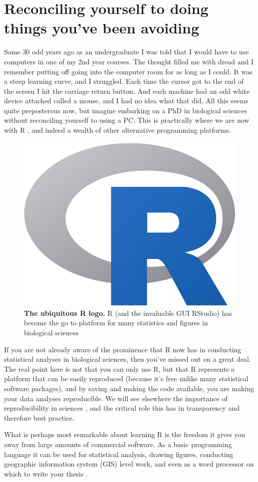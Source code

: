 \documentclass[
]{krantz}
\begin{document}
\hypertarget{useR}{%
\section{Reconciling yourself to doing things you've been avoiding}\label{useR}}

Some 30 odd years ago as an undergraduate I was told that I would have to use computers in one of my 2nd year courses. The thought filled me with dread and I remember putting off going into the computer room for as long as I could. It was a steep learning curve, and I struggled. Each time the cursor got to the end of the screen I hit the carriage return button. And each machine had an odd white device attached called a mouse, and I had no idea what that did. All this seems quite preposterous now, but imagine embarking on a PhD in biological sciences without reconciling yourself to using a PC. This is practically where we are now with R \citep{rcoreteam2021r}, and indeed a wealth of other alternative programming platforms.



\begin{figure}
\includegraphics[width=0.33\linewidth]{figures/Rlogo} \caption{\textbf{The ubiquitous R logo.} R (and the invaluable GUI RStudio) has become the go to platform for many statistics and figures in biological sciences}\label{fig:Rlogo}
\end{figure}

If you are not already aware of the prominence that R now has in conducting statistical analyses in biological sciences, then you've missed out on a great deal. The real point here is not that you can only use R, but that R represents a platform that can be easily reproduced (because it's free unlike many statistical software packages), and by saving and making the code available, you are making your data analyses reproducible. We will see elsewhere the importance of reproducibility in sciences \citep{baker20161500}, and the critical role this has in transparency and therefore best practice.

What is perhaps most remarkable about learning R is the freedom it gives you away from large amounts of commercial software. As a basic programming language it can be used for statistical analysis, drawing figures, conducting geographic information system (GIS) level work, and even as a word processor on which to write your thesis \citep[and indeed this book][]{xie2016bookdown}.
\end{document}
